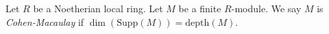 \begin{definition}
\label{definition-CM}
Let $R$ be a Noetherian local ring.
Let $M$ be a finite $R$-module.
We say $M$ is {\it Cohen-Macaulay}
if $\dim(\text{Supp}(M)) = \text{depth}(M)$.
\end{definition}